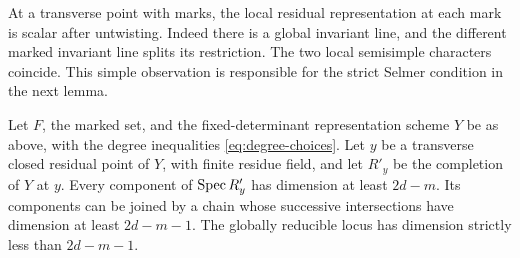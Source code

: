 At a transverse point with marks, the local residual
representation at each mark is scalar after untwisting.
Indeed there is a global invariant line, and the
different marked invariant line splits its restriction.
The two local semisimple characters coincide.
This simple observation is responsible for the strict
Selmer condition in the next lemma.

\begin{lemma}\label{lem:good-connectedness}
Let \(F\), the marked set, and the fixed-determinant representation
scheme \(Y\) be as above, with the degree inequalities
\eqref{eq:degree-choices}. Let \(y\) be a transverse closed residual
point of \(Y\), with finite residue field, and let \(R'_y\) be
the completion of \(Y\) at \(y\). Every component of
\(\operatorname{Spec} R'_y\) has dimension at least \(2d-m\).
Its components can be joined by a chain whose successive
intersections have dimension at least \(2d-m-1\).
The globally reducible locus has dimension strictly
less than \(2d-m-1\).
\end{lemma}
